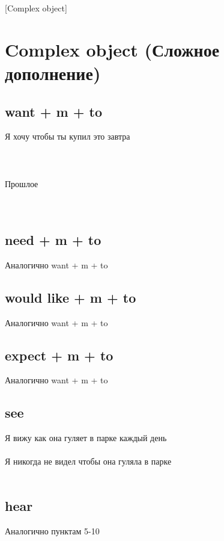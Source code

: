 [Complex object]

\section{Complex object (Сложное дополнение)}
\subsection{want + m + to}
\p
Я хочу чтобы ты купил это завтра\\
\\
\\
\\
Прошлое\\
\\
\\

\subsection{need + m + to}
\p
Аналогично want + m + to

\subsection{would like + m + to}
\p
Аналогично want + m + to

\subsection{expect + m + to}
\p
Аналогично want + m + to\\

\subsection{see}
\p
Я вижу как она гуляет в парке каждый день\\
\\
Я никогда не видел чтобы она гуляла в парке\\
\\

\subsection{hear}
\p
Аналогично пунктам 5-10

